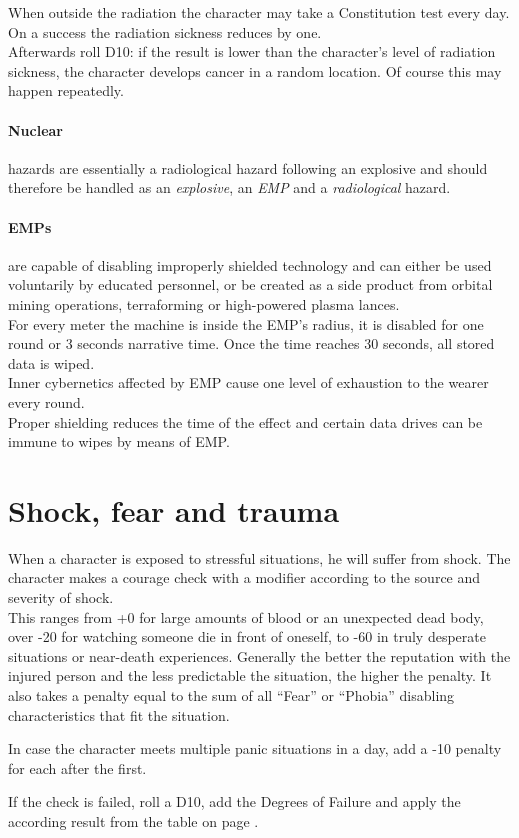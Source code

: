 \documentclass[12pt,a4paper,openany,usenames,dvipsnames]{book}
\begin{document}
	\par
	When outside the radiation the character may take a Constitution test every day. On a success the radiation sickness reduces by one.\\
	Afterwards roll D10: if the result is lower than the character's level of radiation sickness, the character develops cancer in a random location.
	Of course this may happen repeatedly.
	\paragraph{Nuclear} hazards are essentially a radiological hazard following an explosive and should therefore be handled as an \emph{explosive}, an \emph{EMP} and a \emph{radiological} hazard.
	\paragraph{EMPs} are capable of disabling improperly shielded technology and can either be used voluntarily by educated personnel, or be created as a side product from orbital mining operations, terraforming or high-powered plasma lances.\\
	For every meter the machine is inside the EMP’s radius, it is disabled for one round or 3 seconds narrative time. Once the time reaches 30 seconds, all stored data is wiped.\\
	Inner cybernetics affected by EMP cause one level of exhaustion to the wearer every round.\\
	Proper shielding reduces the time of the effect and certain data drives can be immune to wipes by means of EMP.
%
	\section{Shock, fear and trauma}
	When a character is exposed to stressful situations, he will suffer from shock. The character makes a courage check with a modifier according to the source and severity of shock.\\
	This ranges from +0 for large amounts of blood or an unexpected dead body, over -20 for watching someone die in front of oneself, to -60 in truly desperate situations or near-death experiences.
	Generally the better the reputation with the injured person and the less predictable the situation, the higher the penalty. It also takes a penalty equal to the sum of all “Fear” or “Phobia” disabling characteristics that fit the situation.
	\par \vspace{-5mm}
	In case the character meets multiple panic situations in a day, add a -10 penalty for each after the first.
	\par \vspace{-5mm}
	If the check is failed, roll a D10, add the Degrees of Failure and apply the according result from the table on page \pageref{feartable}.
\end{document}
